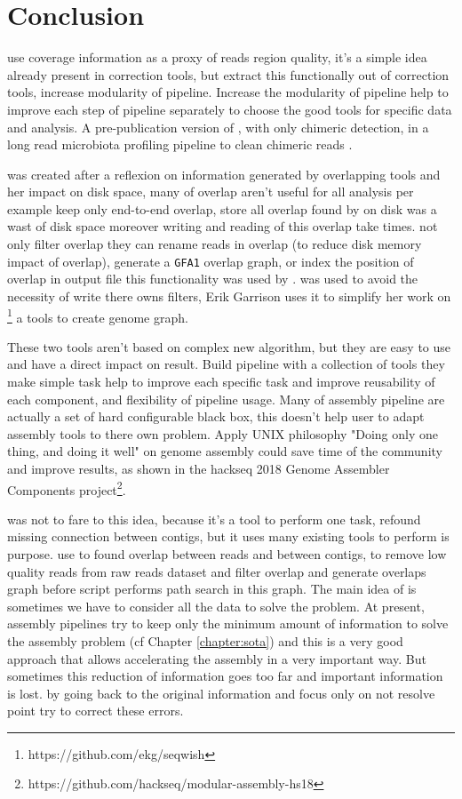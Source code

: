\documentclass[main.tex]{subfiles}
\begin{document}
\chapter{Conclusion}

\yacrd use coverage information as a proxy of reads region quality, it's a simple idea already present in correction tools, but extract this functionally out of correction tools, increase modularity of pipeline. Increase the modularity of pipeline help to improve each step of pipeline separately to choose the good tools for specific data and analysis. A pre-publication version of \yacrd, with only chimeric detection, in a long read microbiota profiling pipeline to clean chimeric reads \cite{cite_yacrd}.

\fpa was created after a reflexion on information generated by overlapping tools and her impact on disk space, many of overlap aren't useful for all analysis per example \miniasm keep only end-to-end overlap, store all overlap found by \minimap on disk was a wast of disk space moreover writing and reading of this overlap take times. \fpa not only filter overlap they can rename reads in overlap (to reduce disk memory impact of overlap), generate a \texttt{GFA1} overlap graph, or index the position of overlap in output file this functionality was used by \consent \cite{CONSENT}. \fpa was used to avoid the necessity of write there owns filters, Erik Garrison uses it to simplify her work on \footnote{https://github.com/ekg/seqwish} a tools to create genome graph.

These two tools aren't based on complex new algorithm, but they are easy to use and have a direct impact on result. Build pipeline with a collection of tools they make simple task help to improve each specific task and improve reusability of each component, and flexibility of pipeline usage. Many of assembly pipeline are actually a set of hard configurable black box, this doesn't help user to adapt assembly tools to there own problem. Apply UNIX philosophy "Doing only one thing, and doing it well" on genome assembly could save time of the community and improve results, as shown in the hackseq 2018 Genome Assembler Components project\footnote{https://github.com/hackseq/modular-assembly-hs18}.

\knot was not to fare to this idea, because it's a tool to perform one task, refound missing connection between contigs, but it uses many existing tools to perform is purpose. \knot use \minimap to found overlap between reads and between contigs, \yacrd to remove low quality reads from raw reads dataset and \fpa filter overlap and generate overlaps graph before \knot script performs path search in this graph. The main idea of \knot is sometimes we have to consider all the data to solve the problem. At present, assembly pipelines try to keep only the minimum amount of information to solve the assembly problem (cf Chapter \ref{chapter:sota}) and this is a very good approach that allows accelerating the assembly in a very important way. But sometimes this reduction of information goes too far and important information is lost. \knot by going back to the original information and focus only on not resolve point try to correct these errors.
\end{document}
